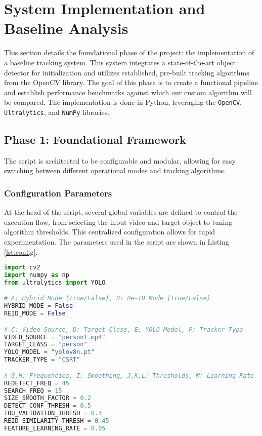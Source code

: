 \documentclass[12pt, a4paper]{article}
\begin{document}
%
%
\section{System Implementation and Baseline Analysis}

This section details the foundational phase of the project: the implementation of a baseline tracking system. This system integrates a state-of-the-art object detector for initialization and utilizes established, pre-built tracking algorithms from the OpenCV library. The goal of this phase is to create a functional pipeline and establish performance benchmarks against which our custom algorithm will be compared. The implementation is done in Python, leveraging the \texttt{OpenCV}, \texttt{Ultralytics}, and \texttt{NumPy} libraries.

\subsection{Phase 1: Foundational Framework}
The script is architected to be configurable and modular, allowing for easy switching between different operational modes and tracking algorithms.

\subsubsection{Configuration Parameters}
At the head of the script, several global variables are defined to control the execution flow, from selecting the input video and target object to tuning algorithm thresholds. This centralized configuration allows for rapid experimentation. The parameters used in the script are shown in Listing \ref{lst:config}.

\begin{lstlisting}[language=Python, caption={Global configuration parameters for the tracking script.}, label={lst:config}]
import cv2
import numpy as np
from ultralytics import YOLO

# A: Hybrid Mode (True/False), B: Re-ID Mode (True/False)
HYBRID_MODE = False 
REID_MODE = False

# C: Video Source, D: Target Class, E: YOLO Model, F: Tracker Type
VIDEO_SOURCE = "person1.mp4"
TARGET_CLASS = "person"
YOLO_MODEL = "yolov8n.pt"
TRACKER_TYPE = "CSRT"

# G,H: Frequencies, I: Smoothing, J,K,L: Thresholds, M: Learning Rate
REDETECT_FREQ = 45
SEARCH_FREQ = 15
SIZE_SMOOTH_FACTOR = 0.2
DETECT_CONF_THRESH = 0.5
IOU_VALIDATION_THRESH = 0.3
REID_SIMILARITY_THRESH = 0.45
FEATURE_LEARNING_RATE = 0.05
\end{lstlisting}
\end{document}
